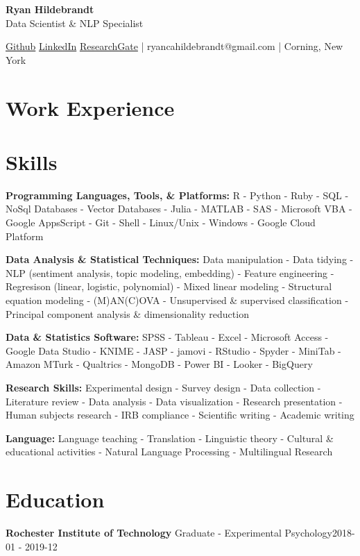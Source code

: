 \documentclass[a4paper,9pt]{extarticle}
\begin{document}
\begin{center}\textbf{\Large Ryan Hildebrandt}\\[2pt]
Data Scientist \& NLP Specialist

\href{https://github.com/ryancahildebrandt}{Github}
\href{https://linkedin.com/in/rcah}{LinkedIn}
\href{https://researchgate.net/profile/Ryan-Hildebrandt}{ResearchGate}
 | ryancahildebrandt@gmail.com | Corning, New York
\end{center}

\section*{Work Experience}

\section*{Skills}
\noindent\textbf{Programming Languages, Tools, \& Platforms:} R - Python - Ruby - SQL - NoSql Databases - Vector Databases - Julia - MATLAB - SAS - Microsoft VBA - Google AppsScript - Git - Shell - Linux/Unix - Windows - Google Cloud Platform

\noindent\textbf{Data Analysis \& Statistical Techniques:} Data manipulation - Data tidying - NLP (sentiment analysis, topic modeling, embedding) - Feature engineering - Regresison (linear, logistic, polynomial) - Mixed linear modeling - Structural equation modeling - (M)AN(C)OVA - Unsupervised \& supervised classification - Principal component analysis \& dimensionality reduction

\noindent\textbf{Data \& Statistics Software:} SPSS - Tableau - Excel - Microsoft Access - Google Data Studio - KNIME - JASP - jamovi - RStudio - Spyder - MiniTab - Amazon MTurk - Qualtrics - MongoDB - Power BI - Looker - BigQuery

\noindent\textbf{Research Skills:} Experimental design - Survey design - Data collection - Literature review - Data analysis - Data visualization - Research presentation - Human subjects research - IRB compliance - Scientific writing - Academic writing

\noindent\textbf{Language:} Language teaching - Translation - Linguistic theory - Cultural \& educational activities - Natural Language Processing - Multilingual Research

\section*{Education}
\noindent\textbf{Rochester Institute of Technology}
Graduate - Experimental Psychology\hfill2018-01 - 2019-12
\end{document}
